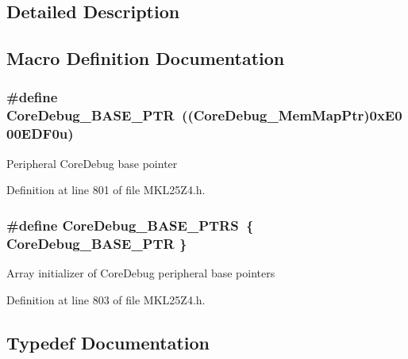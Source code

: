 \subsection{Detailed Description}


\subsection{Macro Definition Documentation}
\subsubsection[{\texorpdfstring{Core\+Debug\+\_\+\+B\+A\+S\+E\+\_\+\+P\+TR}{CoreDebug_BASE_PTR}}]{\setlength{\rightskip}{0pt plus 5cm}\#define Core\+Debug\+\_\+\+B\+A\+S\+E\+\_\+\+P\+TR~(({\bf Core\+Debug\+\_\+\+Mem\+Map\+Ptr})0x\+E000\+E\+D\+F0u)}\hypertarget{group___core_debug___peripheral_ga994a185afca30ede538d89322c4f0326}{}\label{group___core_debug___peripheral_ga994a185afca30ede538d89322c4f0326}
Peripheral Core\+Debug base pointer 

Definition at line 801 of file M\+K\+L25\+Z4.\+h.

\subsubsection[{\texorpdfstring{Core\+Debug\+\_\+\+B\+A\+S\+E\+\_\+\+P\+T\+RS}{CoreDebug_BASE_PTRS}}]{\setlength{\rightskip}{0pt plus 5cm}\#define Core\+Debug\+\_\+\+B\+A\+S\+E\+\_\+\+P\+T\+RS~\{ {\bf Core\+Debug\+\_\+\+B\+A\+S\+E\+\_\+\+P\+TR} \}}\hypertarget{group___core_debug___peripheral_gaceec19d257d8b9f9bff5d47d285dec27}{}\label{group___core_debug___peripheral_gaceec19d257d8b9f9bff5d47d285dec27}
Array initializer of Core\+Debug peripheral base pointers 

Definition at line 803 of file M\+K\+L25\+Z4.\+h.



\subsection{Typedef Documentation}

